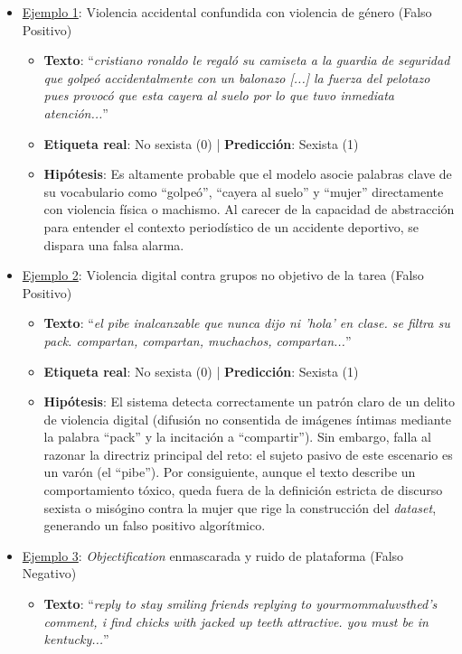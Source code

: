 \begin{itemize} 
    \item \underline{Ejemplo 1}: Violencia accidental confundida con violencia de género (Falso Positivo) 
    \begin{itemize} 
        \item \textbf{Texto}: ``\textit{cristiano ronaldo le regaló su camiseta a la guardia de seguridad que golpeó accidentalmente con un balonazo [...] la fuerza del pelotazo pues provocó que esta cayera al suelo por lo que tuvo inmediata atención...}''
        \item \textbf{Etiqueta real}: No sexista (0) | \textbf{Predicción}: Sexista (1)
        \item \textbf{Hipótesis}: Es altamente probable que el modelo asocie palabras clave de su vocabulario como ``golpeó'', ``cayera al suelo'' y ``mujer'' directamente con violencia física o machismo. Al carecer de la capacidad de abstracción para entender el contexto periodístico de un accidente deportivo, se dispara una falsa alarma.  
    \end{itemize}   
    \item \underline{Ejemplo 2}: Violencia digital contra grupos no objetivo de la tarea (Falso Positivo) 
    \begin{itemize} 
        \item \textbf{Texto}: ``\textit{el pibe inalcanzable que nunca dijo ni 'hola' en clase. se filtra su pack. compartan, compartan, muchachos, compartan...}''
        \item \textbf{Etiqueta real}: No sexista (0) | \textbf{Predicción}: Sexista (1)
        \item \textbf{Hipótesis}: El sistema detecta correctamente un patrón claro de un delito de violencia digital (difusión no consentida de imágenes íntimas mediante la palabra ``pack'' y la incitación a ``compartir''). Sin embargo, falla al razonar la directriz principal del reto: el sujeto pasivo de este escenario es un varón (el ``pibe''). Por consiguiente, aunque el texto describe un comportamiento tóxico, queda fuera de la definición estricta de discurso sexista o misógino contra la mujer que rige la construcción del \textit{dataset}, generando un falso positivo algorítmico.  
    \end{itemize} 
    \item \underline{Ejemplo 3}: \textit{Objectification} enmascarada y ruido de plataforma (Falso Negativo)
    \begin{itemize} 
        \item \textbf{Texto}: ``\textit{reply to stay smiling friends replying to yourmommaluvsthed's comment, i find chicks with jacked up teeth attractive. you must be in kentucky...}''

\end{itemize}
\end{itemize}
